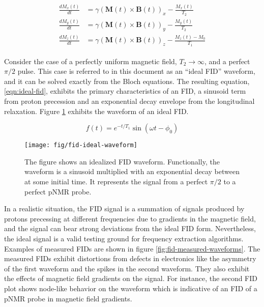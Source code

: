 \begin{align}
\begin{split}
\label{eqn:bloch}
\frac{dM_x(t)}{dt} & = \gamma (\mathbf{M}(t) \times \mathbf{B}(t))_x - \frac{M_x(t)}{T_2} \\
\frac{dM_y(t)}{dt} & = \gamma (\mathbf{M}(t)\times \mathbf{B}(t))_y - \frac{M_y(t)}{T_2} \\
\frac{dM_z(t)}{dt} & = \gamma (\mathbf{M}(t) \times \mathbf{B}(t))_z - \frac{M_z(t) - M_0}{T_1}
\end{split} 
\end{align}

Consider the case of a perfectly uniform magnetic field, $T_2 \rightarrow \infty$, and a perfect $\pi/2$ pulse. This case is referred to in this document as an ``ideal FID'' waveform, and it can be solved exactly from the Bloch equations.  The resulting equation, \ref{eqn:ideal-fid}, exhibits the primary characteristics of an FID, a sinusoid term from proton precession and an exponential decay envelope from the longitudinal relaxation.  Figure \ref{fig:fid-ideal-waveform} exhibits the waveform of an ideal FID.

\begin{equation}
f(t) = e^{-t/T_1} \sin(\omega t - \phi_0)
\label{eqn:ideal-fid}
\end{equation}

\begin{figure}
\centering
\texttt{[image: fig/fid-ideal-waveform]}
\caption{
    The figure shows an idealized FID waveform. Functionally, the waveform is a sinusoid multiplied with an exponential decay between at some initial time.  It represents the signal from a perfect $\pi/2$ to a perfect pNMR probe.
    \label{fig:fid-ideal-waveform}
}
\end{figure}

In a realistic situation, the FID signal is a summation of signals produced by protons precessing at different frequencies due to gradients in the magnetic field, and the signal can bear strong deviations from the ideal FID form.  Nevertheless, the ideal signal is a valid testing ground for frequency extraction algorithms.  Examples of measured FIDs are shown in figure \ref{fig:fid-measured-waveforms}.  The measured FIDs exhibit distortions from defects in electronics like the asymmetry of the first waveform and the spikes in the second waveform.  They also exhibit the effects of magnetic field gradients on the signal.  For instance, the second FID plot shows node-like behavior on the waveform which is indicative of an FID of a pNMR probe in magnetic field gradients.

